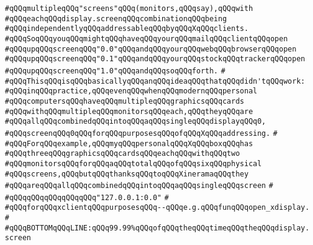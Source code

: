 \verb|#qQQqmultipleqQQq"screens"qQQq(monitors,qQQqsay),qQQqwith|\newline
\verb|#qQQqeachqQQqdisplay.screenqQQqcombinationqQQqbeing|\newline
\verb|#qQQqindependentlyqQQqaddressableqQQqbyqQQqXqQQqclients.|\newline
\verb|#qQQqSoqQQqyouqQQqmightqQQqhaveqQQqyourqQQqmailqQQqclientqQQqopen|\newline
\verb|#qQQqupqQQqscreenqQQq"0.0"qQQqandqQQqyourqQQqwebqQQqbrowserqQQqopen|\newline
\verb|#qQQqupqQQqscreenqQQq"0.1"qQQqandqQQqyourqQQqstockqQQqtrackerqQQqopen|\newline
\verb|#qQQqupqQQqscreenqQQq"1.0"qQQqandqQQqsoqQQqforth.|\newline
\verb|#|\newline
\verb|#qQQqThisqQQqisqQQqbasicallyqQQqanqQQqideaqQQqthatqQQqdidn'tqQQqwork:|\newline
\verb|#qQQqinqQQqpractice,qQQqevenqQQqwhenqQQqmodernqQQqpersonal|\newline
\verb|#qQQqcomputersqQQqhaveqQQqmultipleqQQqgraphicsqQQqcards|\newline
\verb|#qQQqwithqQQqmultipleqQQqmonitorsqQQqeach,qQQqtheyqQQqare|\newline
\verb|#qQQqallqQQqcombinedqQQqintoqQQqaqQQqsingleqQQqdisplayqQQq0,|\newline
\verb|#qQQqscreenqQQq0qQQqforqQQqpurposesqQQqofqQQqXqQQqaddressing.|\newline
\verb|#|\newline
\verb|#qQQqForqQQqexample,qQQqmyqQQqpersonalqQQqXqQQqboxqQQqhas|\newline
\verb|#qQQqthreeqQQqgraphicsqQQqcardsqQQqeachqQQqwithqQQqtwo|\newline
\verb|#qQQqmonitorsqQQqforqQQqaqQQqtotalqQQqofqQQqsixqQQqphysical|\newline
\verb|#qQQqscreens,qQQqbutqQQqthanksqQQqtoqQQqXineramaqQQqthey|\newline
\verb|#qQQqareqQQqallqQQqcombinedqQQqintoqQQqaqQQqsingleqQQqscreen|\newline
\verb|#|\newline
\verb|#qQQqqQQqqQQqqQQqqQQq"127.0.0.1:0.0"|\newline
\verb|#|\newline
\verb|#qQQqforqQQqxclientqQQqpurposesqQQq--qQQqe.g.qQQqfunqQQqopen_xdisplay.|\newline
\verb|#|\newline
\verb|#qQQqBOTTOMqQQqLINE:qQQq99.99%qQQqofqQQqtheqQQqtimeqQQqtheqQQqdisplay.screen|\newline
